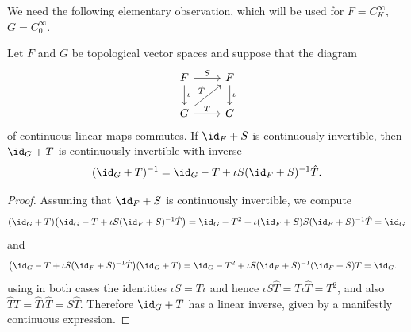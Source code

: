  We need the following elementary observation, which will be used for $F=C_K^\infty$, $G=C_0^\infty$.
 \begin{Lemma}\label{lem:inversetransfer}
 	Let $F$ and $G$ be topological vector spaces and suppose that the diagram
 	\begin{equation*} %
 		\begin{tikzcd}
 			F \arrow[r, "S"]\arrow[d,"\iota"] & F \arrow[d,"\iota"]\\
 			G \arrow[r, "T"]\arrow[ur,"\hat{T}"] & G
 		\end{tikzcd}
 	\end{equation*}
 	of continuous linear maps commutes. If $\id_F+S$ is continuously invertible, then
 	$\id_G+T$ is continuously invertible with inverse
 	\begin{equation*}%
 		(\id_G+ T)^{-1} = \id_G-T+\iota S(\id_F+S)^{-1}\hat{T}.
 	\end{equation*}
 \end{Lemma}
 \begin{proof}
 	Assuming that $\id_F+S$ is continuously invertible, we compute
 	\begin{align*}
 		(\id_G+T)\big(\id_G-T+\iota S(\id_F+S)^{-1}\hat{T}\big) = \id_G-T^2 + \iota (\id_F+S)S(\id_F+S)^{-1}\hat{T}=\id_G
 	\end{align*}
 	and
 	\begin{align*}
 		\big(\id_G-T+\iota S(\id_F+S)^{-1}\hat{T}\big)(\id_G+T) &= \id_G-T^2 + \iota S(\id_F+S)^{-1}(\id_F+S)\hat{T}= \id_G.
 	\end{align*}
 	using in both cases the identities $\iota S=T\iota$ and hence $\iota S \hat{T} = T\iota\hat{T}=T^2$, and also $\hat{T}T = \hat{T}\iota\hat{T} = S\hat{T}$. Therefore $\id_G+T$ has a linear inverse, given by a manifestly continuous expression.
 \end{proof}

